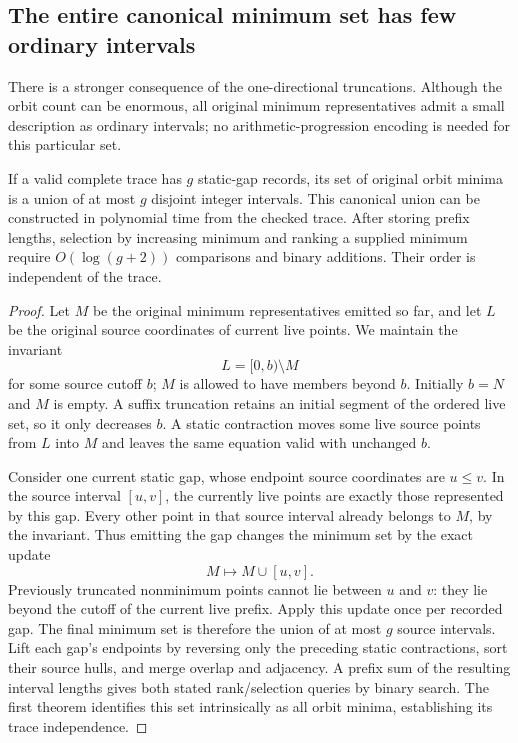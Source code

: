 \subsection{The entire canonical minimum set has few ordinary intervals}

There is a stronger consequence of the one-directional truncations.
Although the orbit count can be enormous, all original minimum
representatives admit a small description as ordinary intervals; no
arithmetic-progression encoding is needed for this particular set.

\begin{theorem}
If a valid complete trace has $g$ static-gap records, its set of original
orbit minima is a union of at most $g$ disjoint integer intervals.  This
canonical union can be constructed in polynomial time from the checked
trace.  After storing prefix lengths, selection by increasing minimum
and ranking a supplied minimum require $O(\log(g+2))$ comparisons and
binary additions.  Their order is independent of the trace.
\end{theorem}
\begin{proof}
Let $M$ be the original minimum representatives emitted so far, and let
$L$ be the original source coordinates of current live points.  We maintain
the invariant
\[
 L=[0,b)\setminus M
\]
for some source cutoff $b$; $M$ is allowed to have members beyond $b$.
Initially $b=N$ and $M$ is empty.  A suffix truncation retains an initial
segment of the ordered live set, so it only decreases $b$.  A static
contraction moves some live source points from $L$ into $M$ and leaves
the same equation valid with unchanged $b$.

Consider one current static gap, whose endpoint source coordinates are
$u\le v$.  In the source interval $[u,v]$, the currently live points are
exactly those represented by this gap.  Every other point in that source
interval already belongs to $M$, by the invariant.  Thus emitting the gap
changes the minimum set by the exact update
\[
 M\longmapsto M\cup[u,v].
\]
Previously truncated nonminimum points cannot lie between $u$ and $v$:
they lie beyond the cutoff of the current live prefix.  Apply this update
once per recorded gap.  The final minimum set is therefore the union of
at most $g$ source intervals.  Lift each gap's endpoints by reversing only
the preceding static contractions, sort their source hulls, and merge
overlap and adjacency.  A prefix sum of the resulting interval lengths
gives both stated rank/selection queries by binary search.  The first
theorem identifies this set intrinsically as all orbit minima, establishing
its trace independence.
\end{proof}

